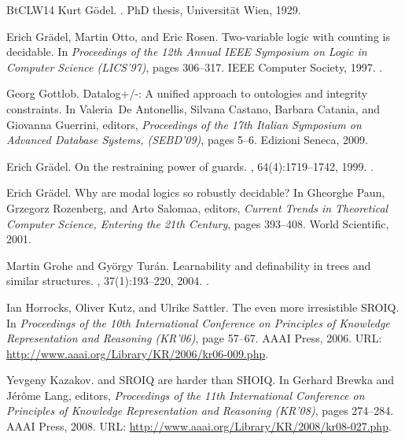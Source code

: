 \documentclass[10pt,a4paper]{amsart}
\theoremstyle{definition}
\numberwithin{equation}{section}
\theoremstyle{plain}
\theoremstyle{definition}
\theoremstyle{myexample}
\theoremstyle{plain}
\theoremstyle{definition}
\begin{document}
\begin{thebibliography}{BtCLW14}
Kurt G{\"o}del.
.
\newblock PhD thesis, Universit\"at Wien, 1929.

Erich Gr{\"{a}}del, Martin Otto, and Eric Rosen.
\newblock Two-variable logic with counting is decidable.
\newblock In {\em Proceedings of the 12th Annual {IEEE} Symposium on Logic in
  Computer Science ({LICS}'97)}, pages 306--317. {IEEE} Computer Society, 1997.
\newblock \href {https://doi.org/10.1109/LICS.1997.614957}
  {}.

Georg Gottlob.
\newblock Datalog+/-: {A} unified approach to ontologies and integrity
  constraints.
\newblock In Valeria~De Antonellis, Silvana Castano, Barbara Catania, and
  Giovanna Guerrini, editors, {\em Proceedings of the 17th Italian Symposium on
  Advanced Database Systems, (SEBD'09)}, pages 5--6. Edizioni Seneca, 2009.

Erich Gr{\"{a}}del.
\newblock On the restraining power of guards.
, 64(4):1719--1742, 1999.
\newblock \href {https://doi.org/10.2307/2586808} {}.

Erich Gr{\"{a}}del.
\newblock Why are modal logics so robustly decidable?
\newblock In Gheorghe Paun, Grzegorz Rozenberg, and Arto Salomaa, editors, {\em
  Current Trends in Theoretical Computer Science, Entering the 21th Century},
  pages 393--408. World Scientific, 2001.

Martin Grohe and Gy{\"{o}}rgy Tur{\'{a}}n.
\newblock Learnability and definability in trees and similar structures.
, 37(1):193--220, 2004.
\newblock \href {https://doi.org/10.1007/s00224-003-1112-8}
  {}.

Ian Horrocks, Oliver Kutz, and Ulrike Sattler.
\newblock The even more irresistible {SROIQ}.
\newblock In {\em Proceedings of the 10th International Conference on
  Principles of Knowledge Representation and Reasoning (KR'06)}, page 57–67.
  AAAI Press, 2006.
\newblock URL: \url{http://www.aaai.org/Library/KR/2006/kr06-009.php}.

Yevgeny Kazakov.
 and {SROIQ} are harder than {SHOIQ}.
\newblock In Gerhard Brewka and J{\'{e}}r{\^{o}}me Lang, editors, {\em
  Proceedings of the 11th International Conference on Principles of Knowledge
  Representation and Reasoning ({KR}'08)}, pages 274--284. {AAAI} Press, 2008.
\newblock URL: \url{http://www.aaai.org/Library/KR/2008/kr08-027.php}.


\end{thebibliography}
\end{document}
